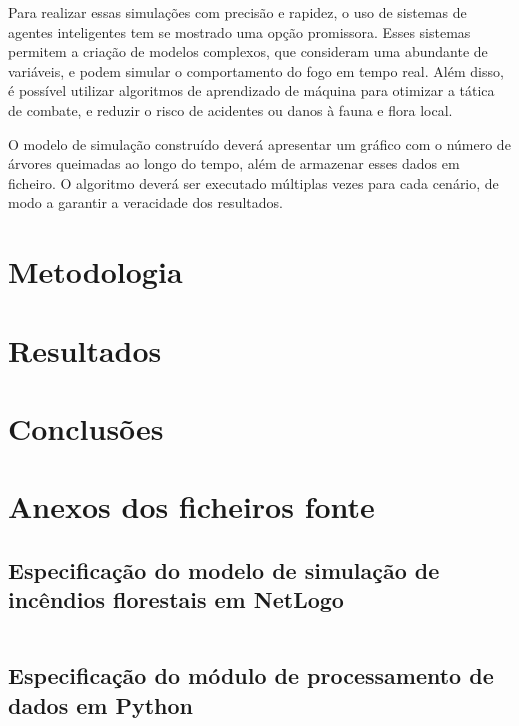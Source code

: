 \documentclass[a4paper, portuguese]{report}
\begin{document}
    Para realizar essas simulações com precisão e rapidez, o uso de sistemas de agentes inteligentes tem se mostrado uma opção promissora.
    Esses sistemas permitem a criação de modelos complexos, que consideram uma abundante de variáveis, e podem simular o comportamento do fogo em tempo real.
    Além disso, é possível utilizar algoritmos de aprendizado de máquina para otimizar a tática de combate, e reduzir o risco de acidentes ou danos à fauna e flora local.

    O modelo de simulação construído deverá apresentar um gráfico com o número de árvores queimadas ao longo do tempo, além de armazenar esses dados em ficheiro.
    O algoritmo deverá ser executado múltiplas vezes para cada cenário, de modo a garantir a veracidade dos resultados.


    \chapter{Metodologia}\label{ch:methodology}
    


    \chapter{Resultados}\label{ch:results}
    


    \chapter{Conclusões}\label{ch:conclusoes}
    

    \appendix


    \chapter{Anexos dos ficheiros fonte}\label{ch:appendix}


    \section{Especificação do modelo de simulação de incêndios florestais em NetLogo}\label{sec:model_spec}
    \inputminted[breaklines]{nl-lexer.py:NetLogoLexer -x}{../src/forest_fire.nlogo}


    \section{Especificação do módulo de processamento de dados em Python}\label{sec:data_proc}
\end{document}
